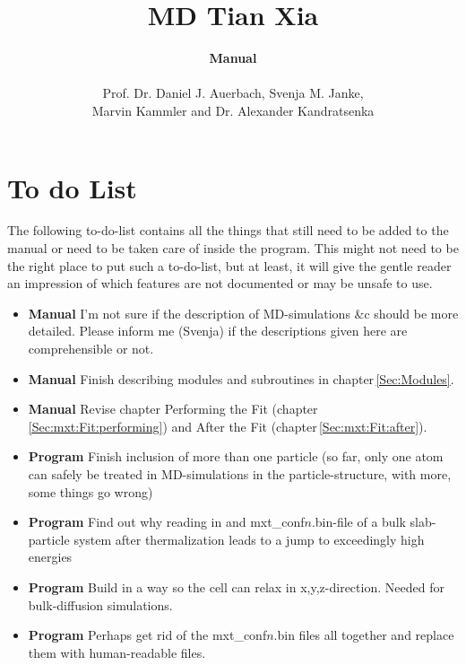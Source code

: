 \documentclass[twoside, 11pt, titlepage, captions=nooneline, a4paper, headsepline]{scrbook}%
\title{\huge{MD Tian Xia}}
\author{\textbf{Manual}\\ \\Prof. Dr. Daniel J. Auerbach, Svenja M. Janke,\\Marvin Kammler and Dr. Alexander Kandratsenka}
\date{}
\newcommand{\9}{\mathrm}
\newcommand{\0}{\,\mathrm}
\begin{document}
\frontmatter

\maketitle
\thispagestyle{empty}
\newpage
\tableofcontents
\newpage


\mainmatter

\chapter{To do List}
The following to-do-list contains all the things that still need to be added to the manual or need to be taken care of inside the program. This might not need to be the right place to put such a to-do-list, but at least, it will give the gentle reader an impression of which features are not documented or may be unsafe to use.\\
\begin{itemize}
\item \textbf{Manual} I'm not sure if the description of MD-simulations \&c should be more detailed. Please inform me (Svenja) if the descriptions given here are comprehensible or not.
\item\textbf{Manual} Finish describing modules and subroutines in chapter\,\ref{Sec:Modules}.
\item\textbf{Manual} Revise chapter Performing the Fit (chapter\,\ref{Sec:mxt:Fit:performing}) and After the Fit (chapter\,\ref{Sec:mxt:Fit:after}).
\item\textbf{Program} Finish inclusion of more than one particle (so far, only one atom can safely be treated in MD-simulations in the particle-structure, with more, some things go wrong) 
\item\textbf{Program} Find out why reading in and mxt\_conf$n$.bin-file of a bulk slab-particle system after thermalization leads to a jump to exceedingly high energies
\item\textbf{Program} Build in a way so the cell can relax in x,y,z-direction. Needed for bulk-diffusion simulations.
\item\textbf{Program} Perhaps get rid of the mxt\_conf$n$.bin files all together and replace them with human-readable files.
\end{itemize}
\end{document}

